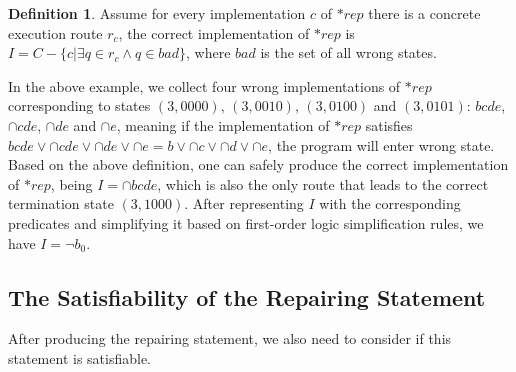 \documentclass[10pt,journal,final,]{article}
\theoremstyle{definition}
\newtheorem{definition}{Definition}[section]
\begin{document}
\begin{definition}
\label{definition:CorrentREP}
Assume for every implementation $c$ of $*rep$ there is a concrete execution route $r_{c}$, the correct implementation of $*rep$ is $I = C - \{c | \exists q \in r_{c} \wedge q \in bad\}$, where $bad$ is the set of all wrong states.
\end{definition}

In the above example, we collect four wrong implementations of $*rep$ corresponding to states $(3,0000)$, $(3,0010)$, $(3,0100)$ and $(3,0101)$: $bcde$, $\cap{c}de$, $\cap{d}e$ and $\cap{e}$,
meaning if the implementation of $*rep$ satisfies $bcde \vee \cap{c}de \vee \cap{d}e \vee \cap{e} = b \vee \cap{c} \vee \cap{d} \vee \cap{e}$, the program will enter wrong state.
Based on the above definition, one can safely produce the correct implementation of $*rep$, being $I = \cap{b}cde$, which is also the only route that leads to the correct termination state $(3,1000)$.
After representing $I$ with the corresponding predicates and simplifying it based on first-order logic simplification rules, we have $I = \neg b_{0}$.

\subsection{The Satisfiability of the Repairing Statement}
\label{section:TheSatisfiabilityOfTheRepairingStatement}
After producing the repairing statement, we also need to consider if this statement is satisfiable.
\end{document}
